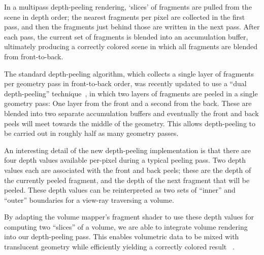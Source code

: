 In a multipass depth-peeling rendering, `slices' of fragments are pulled from
the scene in depth order; the nearest fragments per pixel are collected in
the first pass, and then the fragments just behind those are written in the next
pass. After each pass, the current set of fragments is blended into an
accumulation buffer, ultimately producing a correctly colored scene in which all
fragments are blended from front-to-back.

The standard depth-peeling algorithm, which collects a single layer of fragments
per geometry pass in front-to-back order, was recently updated to use a ``dual
depth-peeling'' technique~\citep{bavoil_order_2008}, in which two layers of
fragments are peeled in a single geometry pass: One layer from the front and a
second from the back. These are blended into two separate accumulation buffers
and eventually the front and back peels will meet towards the middle of the
geometry. This allows depth-peeling to be carried out in roughly half as many
geometry passes.

An interesting detail of the new depth-peeling implementation is that there are
four depth values available per-pixel during a typical peeling pass. Two depth
values each are associated with the front and back peels; these are the depth of
the currently peeled fragment, and the depth of the next fragment that will be
peeled. These depth values can be reinterpreted as two sets of ``inner'' and
``outer'' boundaries for a view-ray traversing a volume.

By adapting the volume mapper's fragment shader to use these depth values for
computing two ``slices'' of a volume, we are able to integrate volume rendering
into our depth-peeling pass. This enables volumetric data to be mixed with
translucent geometry while efficiently yielding a correctly colored result
~.

